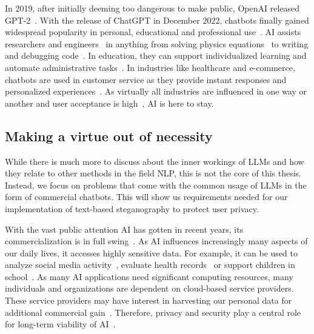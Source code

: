 In 2019, after initially deeming too dangerous to make public, OpenAI released GPT-2~\cite{hernNewAIFake2019}. With the release of ChatGPT in December 2022, chatbots finally gained widespread popularity in personal, educational and professional use~\cite{wuUnveilingSecurityPrivacy2024}. \gls{AI} assists researchers and engineers~\cite{schmidgallAgentLaboratoryUsing2025} in anything from solving physics equations~\cite{panQuantumManybodyPhysics2025,songLLMFeynmanLeveragingLarge2025} to writing and debugging code~\cite{shiCodeCorrectnessClosing2024,tianDebugBenchEvaluatingDebugging2024,leeUnifiedDebuggingApproach2024,leeGitHubRecentBugs2024}. In education, they can support individualized learning and automate administrative tasks~\cite{mienyeChatGPTEducationReview2025}. In industries like healthcare and e-commerce, chatbots are used in customer service as they provide instant responses and personalized experiences~\cite{wangELIZAChatGPTBrief2024}. As virtually all industries are influenced in one way or another and user acceptance is high~\cite{wangHistoryDevelopmentPrinciples2024,wangELIZAChatGPTBrief2024}, \gls{AI} is here to stay.

\subsection{Making a virtue out of necessity}
\label{sec:makingAVirtueOutOfNecessity}
While there is much more to discuss about the inner workings of \glspl{LLM} and how they relate to other methods in the field \gls{NLP}, this is not the core of this thesis. Instead, we focus on problems that come with the common usage of \glspl{LLM} in the form of commercial chatbots. This will show us requirements needed for our implementation of text-based steganography to protect user privacy.

With the vast public attention \gls{AI} has gotten in recent years, its commercialization is in full swing~\cite{soniOpenAIOutlinesNew2025}. As \gls{AI} influences increasingly many aspects of our daily lives, it accesses highly sensitive data. For example, it can be used to analyze social media activity~\cite{sufiSocialMediaAnalytics2023}, evaluate health records~\cite{lovonEvaluatingLLMAbilities2025} or support children in school~\cite{mienyeChatGPTEducationReview2025}. As many \gls{AI} applications need significant computing resources, many individuals and organizations are dependent on cloud-based service providers. These service providers may have interest in harvesting our personal data for additional commercial gain~\cite{biddleFacebookEngineersWe2022,mccallumMetaFacebookOwner2023}. Therefore, privacy and security play a central role for long-term viability of \gls{AI}~\cite{guptaChatGPTThreatGPTImpact2023,wuUnveilingSecurityPrivacy2024}.

